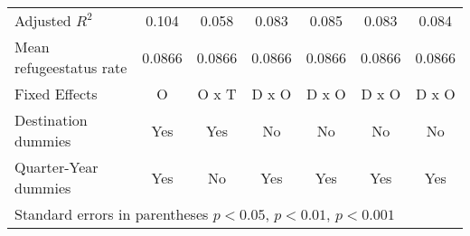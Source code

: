 \begin{table}[!ht]
\begin{tabular}{l*{6}{c}}
Adjusted \(R^{2}\)  &       0.104         &       0.058         &       0.083         &       0.085         &       0.083         &       0.084         \\
Mean refugeestatus rate&      0.0866         &      0.0866         &      0.0866         &      0.0866         &      0.0866         &      0.0866         \\
Fixed Effects       &           O         &       O x T         &       D x O         &       D x O         &       D x O         &       D x O         \\
Destination dummies &         Yes         &         Yes         &          No         &          No         &          No         &          No         \\
Quarter-Year dummies&         Yes         &          No         &         Yes         &         Yes         &         Yes         &         Yes         \\
\hline\hline
\multicolumn{7}{l}{ Standard errors in parentheses \sym{*} \(p<0.05\), \sym{**} \(p<0.01\), \sym{***} \(p<0.001\)}\\
\end{tabular}
\end{table}
